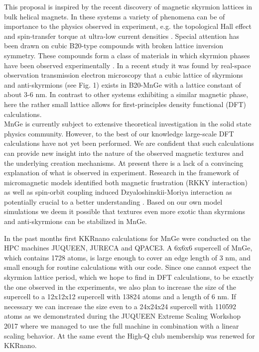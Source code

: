 \documentclass [a4paper, 12pt]{article}
\begin{document}
This proposal is inspired by the recent discovery of magnetic skyrmion lattices in bulk helical magnets.
In these systems a variety of phenomena can be of importance to the physics observed in experiment,
e.g. the topological Hall effect and spin-transfer torque at ultra-low current densities
\cite{kanazawa_large_2011}.
Special attention has been drawn on cubic B20-type compounds with broken lattice inversion symmetry.
These compounds form a class of materials in which skyrmion phases have been observed experimentally
\cite{nagaosa_topological_2013}.
In a recent study \cite{tanigaki_real-space_2015} 
it was found by real-space observation transmission electron microscopy 
that a cubic lattice of skyrmions and anti-skyrmions (see Fig. 1) exists in B20-MnGe with
a lattice constant of about 3-6 nm. In contrast to other systems exhibiting a similar magnetic phase,
here the rather small lattice allows for first-principles density functional (DFT) calculations. 
\\
MnGe is currently subject to extensive theoretical investigation in the solid state physics community.
However, to the best of our knowledge large-scale DFT calculations have not yet been performed.
We are confident that such calculations can provide new insight into the nature of
the observed magnetic textures and the underlying creation mechanisms.
At present there is a lack of a convincing explanation of what is observed in experiment. 
Research in the framework of micromagnetic models identified both magnetic frustration (RKKY interaction) 
as well as spin-orbit coupling induced Dzyaloshinskii-Moriya interaction as potentially
crucial to a better understanding \cite{koretsune_control_2015,altynbaev_hidden_2016}.
Based on our own model simulations we deem it
possible that textures even more exotic than skyrmions and anti-skyrmions \cite{rybakov_new_2015}
can be stabilized in MnGe.

In the past months first KKRnano calculations for MnGe were conducted on the HPC machines JUQUEEN,
JURECA and QPACE3. A 6x6x6 supercell of MnGe, which contains 1728 atoms, is large enough to cover 
an edge length of 3 nm, and small enough for routine calculations with our code. Since one cannot 
expect the skyrmion lattice period, which we hope to find in DFT calculations, to be exactly the 
one observed in the experiments, we also plan to increase the size of the supercell to a 12x12x12
supercell with 13824 atoms and a length of 6 nm. If necessary we can increase the size even
to a 24x24x24 supercell with 110592 atoms as we demonstrated during the
JUQUEEN Extreme Scaling Workshop 2017 \cite{brommel_juqueen_2017}
where we managed to use the full machine in combination 
with a linear scaling behavior.
At the same event the High-Q club membership was renewed for KKRnano.
\end{document}
